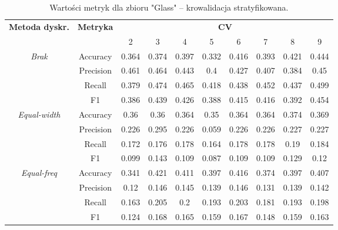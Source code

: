 \begin{table}[H]
\center
    \caption{Wartości metryk dla zbioru "Glass" -- krowalidacja stratyfikowana.}
    \begin{tabular}{|c|c|c|c|c|c|c|c|c|c|}
        \hline
        \multirow{2}{*}{\textbf{Metoda dyskr.}} & \multirow{2}{*}{\textbf{Metryka}} & \multicolumn{8}{|c|}{\textbf{CV}} \\ \cline{3-10}
                        &  & 2 & 3 & 4 & 5 & 6 & 7 & 8 & 9 \\ \hline
        \multirow{4}{*}{\textit{Brak}}  & Accuracy & 0.364 & 0.374 & 0.397 & 0.332 & 0.416 & 0.393 & 0.421 & 0.444 \\ \cline{2-10}
                                         & Precision & 0.461 & 0.464 & 0.443 & 0.4 & 0.427 & 0.407 & 0.384 & 0.45 \\ \cline{2-10}
                                         & Recall & 0.379 & 0.474 & 0.465 & 0.418 & 0.438 & 0.452 & 0.437 & 0.499 \\ \cline{2-10}
                                         & F1 & 0.386 & 0.439 & 0.426 & 0.388 & 0.415 & 0.416 & 0.392 & 0.454 \\ \hline \hline


        \multirow{4}{*}{\textit{Equal-width}}  & Accuracy & 0.36 & 0.36 & 0.364 & 0.35 & 0.364 & 0.364 & 0.374 & 0.369 \\ \cline{2-10}
                                             & Precision & 0.226 & 0.295 & 0.226 & 0.059 & 0.226 & 0.226 & 0.227 & 0.227 \\ \cline{2-10}
                                             & Recall & 0.172 & 0.176 & 0.178 & 0.164 & 0.178 & 0.178 & 0.19 & 0.184 \\ \cline{2-10}
                                             & F1 & 0.099 & 0.143 & 0.109 & 0.087 & 0.109 & 0.109 & 0.129 & 0.12 \\ \hline \hline


        \multirow{4}{*}{\textit{Equal-freq}}  & Accuracy & 0.341 & 0.421 & 0.411 & 0.397 & 0.416 & 0.374 & 0.397 & 0.407 \\ \cline{2-10}
                                             & Precision & 0.12 & 0.146 & 0.145 & 0.139 & 0.146 & 0.131 & 0.139 & 0.142 \\ \cline{2-10}
                                             & Recall & 0.163 & 0.205 & 0.2 & 0.193 & 0.203 & 0.181 & 0.193 & 0.198 \\ \cline{2-10}
                                             & F1 & 0.124 & 0.168 & 0.165 & 0.159 & 0.167 & 0.148 & 0.159 & 0.163 \\ \hline \hline



\end{tabular}
\end{table}
